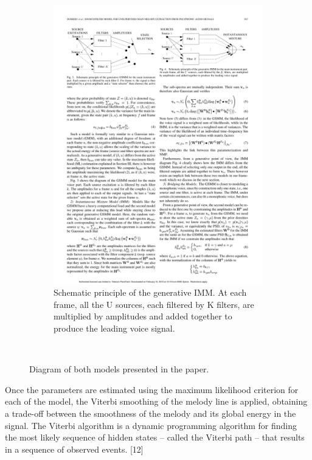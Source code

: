 \begin{figure}
\begin{subfigure}[b]{0.47\textwidth}
                \includegraphics[width=\textwidth]{Figures/imm}
                \caption{Schematic principle of the generative IMM. At each frame, all the U sources, each filtered by K filters, are multiplied by amplitudes and added together to produce the leading voice signal.}
                \label{fig:Controller}
        \end{subfigure}
          \caption{Diagram of both models presented in the paper.}
        ~ %
\end{figure}

Once the parameters are estimated using the maximum likelihood criterion for each of the model, the Viterbi smoothing of the melody line is applied, obtaining a trade-off between the smoothness of the melody and its global energy in the signal. The Viterbi algorithm is a dynamic programming algorithm for finding the most likely sequence of hidden states – called the Viterbi path – that results in a sequence of observed events. [12]
 
